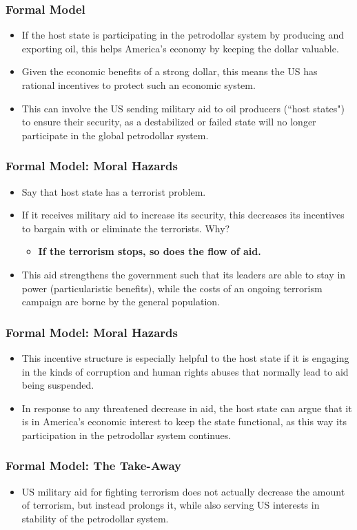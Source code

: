 \documentclass[handout]{beamer}
\begin{document}
\begin{frame} 
	\frametitle{\LARGE{Formal Model}}
	\begin{itemize}
		\item If the host state is participating in the petrodollar system by producing and exporting oil, this helps America's economy by keeping the dollar valuable. \pause
		\item Given the economic benefits of a strong dollar, this means the US has rational incentives to protect such an economic system. \pause
		\item This can involve the US sending military aid to oil producers (``host states") to ensure their security, as a destabilized or failed state will no longer participate in the global petrodollar system.
	\end{itemize}
\end{frame}

\begin{frame} 
	\frametitle{\LARGE{Formal Model: Moral Hazards}}
	\begin{itemize}
		\item Say that host state has a terrorist problem. \pause
		\item If it receives military aid to increase its security, this decreases its incentives to bargain with or eliminate the terrorists. Why? \pause
		\begin{itemize}
			\item \textbf{If the terrorism stops, so does the flow of aid.}
		\end{itemize}
		\item This aid strengthens the government such that its leaders are able to stay in power (particularistic benefits), while the costs of an ongoing terrorism campaign are borne by the general population.
	\end{itemize}
\end{frame}

\begin{frame} 
	\frametitle{\LARGE{Formal Model: Moral Hazards}}
	\begin{itemize}
		\item This incentive structure is especially helpful to the host state if it is engaging in the kinds of corruption and human rights abuses that normally lead to aid being suspended. \pause
		\item In response to any threatened decrease in aid, the host state can argue that it is in America's economic interest to keep the state functional, as this way its participation in the petrodollar system continues. 
	\end{itemize}
\end{frame}

\begin{frame} 
	\frametitle{\LARGE{Formal Model: The Take-Away}}
	\begin{itemize}
		\item US military aid for fighting terrorism does not actually decrease the amount of terrorism, but instead prolongs it, while also serving US interests in stability of the petrodollar system.
	\end{itemize}
\end{frame}
\end{document}
